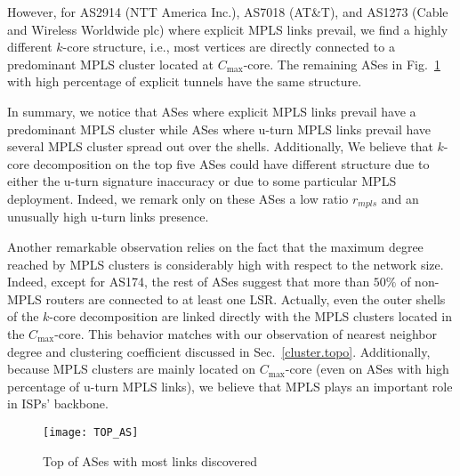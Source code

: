 However, for AS2914 (NTT America Inc.), AS7018 (AT\&T), and AS1273 (Cable and
Wireless Worldwide plc) where explicit MPLS links prevail, we find a highly
different $k$-core structure, i.e., most vertices are directly connected to a
predominant MPLS cluster located at $C_{\max}$-core. The remaining ASes in
Fig.~\ref{top_as} with high percentage of explicit tunnels have the same
structure.

In summary, we notice that ASes where explicit MPLS links prevail have a
predominant MPLS cluster while ASes where u-turn MPLS links prevail have several
MPLS cluster spread out over the shells. Additionally, We believe that $k$-core
decomposition on the top five ASes could have different structure due to either
the u-turn signature inaccuracy or due to some particular MPLS deployment.
Indeed, we remark only on these ASes a low ratio $r_{mpls}$ and an unusually 
high u-turn links presence.

Another remarkable observation relies on the fact that the maximum degree
reached by MPLS clusters is considerably high with respect to the network size.
Indeed, except for AS174, the rest of ASes suggest that more than $50\%$ of
non-MPLS routers are connected to at least one LSR. Actually, even the outer
shells of the $k$-core decomposition are linked directly with the MPLS clusters
located in the $C_{\max}$-core. This behavior matches with our observation of
nearest neighbor degree and clustering coefficient discussed in
Sec.~\ref{cluster.topo}. Additionally, because MPLS clusters are mainly located
on $C_{\max}$-core (even on ASes with high percentage of u-turn MPLS links),
we believe that MPLS plays an important role in ISPs' backbone.

\begin{figure}[!htb]
  \begin{center}
    \texttt{[image: TOP\_AS]}
  \end{center}
  \caption{Top of ASes with most links discovered}
  \label{top_as}
\end{figure}

